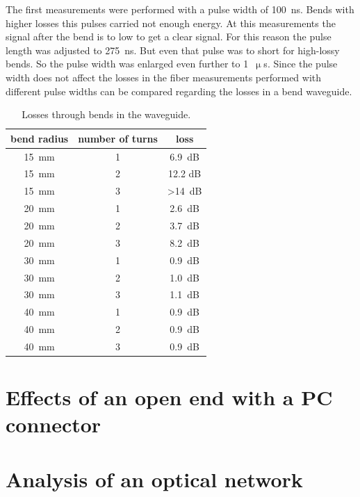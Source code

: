 The first measurements were performed with a pulse width of 100~ns. Bends with higher losses this pulses carried not enough energy. At this measurements the signal after the bend is to low to get a clear signal. For this reason the pulse length was adjusted to 275~ns. 
But even that pulse was to short for high-lossy bends. So the pulse width was enlarged even further to 1~$\upmu$s. 
Since the pulse width does not affect the losses in the fiber measurements performed with different pulse widths can be compared regarding the losses in a bend waveguide.

\begin{table}%
\centering
\caption{Losses through bends in the waveguide.}
 
\begin{tabular}{ccc}

\toprule

bend radius	& number of turns	&	loss\\
\midrule
15~mm	&	1	& 6.9~dB	\\
15~mm	&	2	& 12.2 dB	\\
15~mm	&	3	& >14~dB		\\
\midrule
20~mm	&	1	& 2.6~dB		\\
20~mm	&	2	&3.7~dB	\\
20~mm	&	3	& 8.2~dB	\\\midrule
30~mm	&	1	&0.9~dB		\\
30~mm	&	2	& 1.0~dB	\\
30~mm	&	3	& 1.1~dB	\\\midrule
40~mm	&	1	&	0.9~dB	\\
40~mm	&	2	&0.9~dB		\\
40~mm	&	3	& 0.9~dB	\\
\bottomrule 
\end{tabular}
\label{tab:3_daempfung}
\end{table}



\section{Effects of an open end with a PC connector}

\section{Analysis of an optical network}



